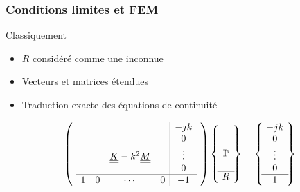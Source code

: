 \documentclass[10pt, compress]{beamer}
\newcommand\GP{\mathbb{P}}
\begin{document}
\begin{frame}
	\frametitle{Conditions limites et FEM}

	\begin{block}{Classiquement}
		\begin{itemize}
			\item $R$ considéré comme une inconnue
			\item Vecteurs et matrices étendues
			\item Traduction exacte des équations de continuité
		\end{itemize}

		\pause

		\begin{equation*}
			\left(~
			\begin{array}{cccc|c}
				&&&&-jk\\
				&&&&0\\
				& & \uul{K} - k^2\uul{M} & &\vdots \\
				&&&&0\\\hline
					1 & 0 & \cdots & 0& -1 \\
			\end{array}
			~\right)
			\left\{~
			\begin{matrix}
				\\
				\\
				\GP\\
				\\\hline
				R
			\end{matrix}
			~\right\} = 
			\left\{~
			\begin{matrix}
				-jk\\
				0\\
				\vdots\\
				0\\\hline
				1
			\end{matrix}
			~\right\}
		\end{equation*}
	\end{block}
\end{frame}
\end{document}
